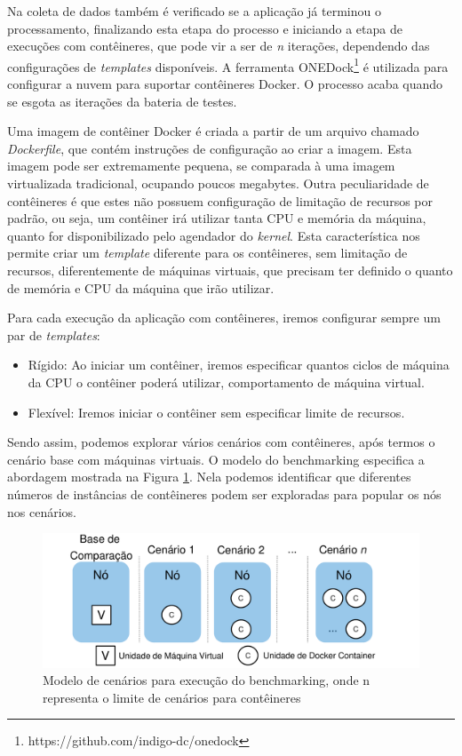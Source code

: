 \documentclass[twoside,english,brazilian]{UNISINOSartigo}
\begin{document}
Na coleta de dados também é verificado se a aplicação já terminou o processamento, finalizando esta etapa do processo e iniciando a etapa de execuções com contêineres, que pode vir a ser de \textit{n} iterações, dependendo das configurações de \textit{templates} disponíveis. A ferramenta ONEDock\footnote{https://github.com/indigo-dc/onedock} é utilizada para configurar a nuvem para suportar contêineres Docker. O processo acaba quando se esgota as iterações da bateria de testes.

Uma imagem de contêiner Docker é criada a partir de um arquivo chamado \textit{Dockerfile}, que contém instruções de configuração ao criar a imagem. Esta imagem pode ser extremamente pequena, se comparada à uma imagem virtualizada tradicional, ocupando poucos megabytes. Outra peculiaridade de contêineres é que estes não possuem configuração de limitação de recursos por padrão, ou seja, um contêiner irá utilizar tanta CPU e memória da máquina, quanto for disponibilizado pelo agendador do \textit{kernel}. Esta característica nos permite criar um \textit{template} diferente para os contêineres, sem limitação de recursos, diferentemente de máquinas virtuais, que precisam ter definido o quanto de memória e CPU da máquina que irão utilizar. 

Para cada execução da aplicação com contêineres, iremos configurar sempre um par de \textit{templates}:
\begin{itemize}
	\item Rígido: Ao iniciar um contêiner, iremos especificar quantos ciclos de máquina da CPU o contêiner poderá utilizar, comportamento de máquina virtual.
	\item Flexível: Iremos iniciar o contêiner sem especificar limite de recursos.
\end{itemize} 

Sendo assim, podemos explorar vários cenários com contêineres, após termos o cenário base com máquinas virtuais. O modelo do benchmarking especifica a abordagem mostrada na Figura \ref{fig:modelo}. Nela podemos identificar que diferentes números de instâncias de contêineres podem ser exploradas para popular os nós nos cenários.

\begin{figure}[ht!]
	\caption{Modelo de cenários para execução do benchmarking, onde n representa o limite de cenários para contêineres}
	\label{fig:modelo}
	\centering%
	\vspace{-0.75\baselineskip}
	\begin{minipage}{0.7\textwidth}
		\includegraphics[width=\textwidth]{images/modelo}
	\end{minipage}
\end{figure}
\end{document}
